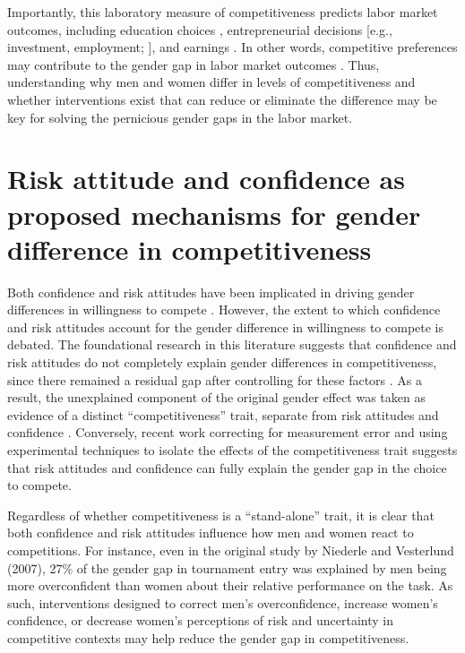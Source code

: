 \documentclass[a4paper,nobind]{templates/ociamthesis}
\begin{document}
Importantly, this laboratory measure of competitiveness predicts labor market outcomes, including education choices \autocite{Buser2014,Zhang2012}, entrepreneurial decisions {[}e.g., investment, employment; \textcite{Berge2015}{]}, and earnings \autocite{Reuben2015}. In other words, competitive preferences may contribute to the gender gap in labor market outcomes \autocite{Blau2017}. Thus, understanding why men and women differ in levels of competitiveness and whether interventions exist that can reduce or eliminate the difference may be key for solving the pernicious gender gaps in the labor market.

\hypertarget{risk-attitude-and-confidence-as-proposed-mechanisms-for-gender-difference-in-competitiveness}{%
\section{Risk attitude and confidence as proposed mechanisms for gender difference in competitiveness}\label{risk-attitude-and-confidence-as-proposed-mechanisms-for-gender-difference-in-competitiveness}}

Both confidence and risk attitudes have been implicated in driving gender differences in willingness to compete \autocite{Niederle2011,Veldhuizen2017}. However, the extent to which confidence and risk attitudes account for the gender difference in willingness to compete is debated. The foundational research in this literature suggests that confidence and risk attitudes do not completely explain gender differences in competitiveness, since there remained a residual gap after controlling for these factors \autocite{Niederle2007}. As a result, the unexplained component of the original gender effect was taken as evidence of a distinct ``competitiveness'' trait, separate from risk attitudes and confidence \autocite{Niederle2007,Niederle2011}. Conversely, recent work correcting for measurement error \autocite{Gillen2019} and using experimental techniques to isolate the effects of the competitiveness trait \autocite{Veldhuizen2017} suggests that risk attitudes and confidence can fully explain the gender gap in the choice to compete.

Regardless of whether competitiveness is a ``stand-alone'' trait, it is clear that both confidence and risk attitudes influence how men and women react to competitions. For instance, even in the original study by Niederle and Vesterlund (2007), 27\% of the gender gap in tournament entry was explained by men being more overconfident than women about their relative performance on the task. As such, interventions designed to correct men's overconfidence, increase women's confidence, or decrease women's perceptions of risk and uncertainty in competitive contexts may help reduce the gender gap in competitiveness.
\end{document}

